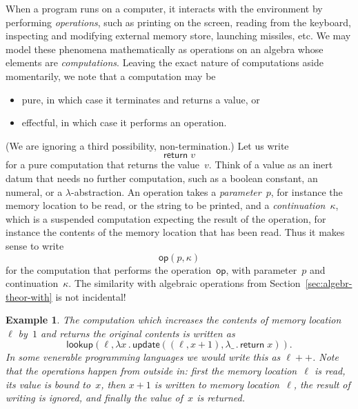 \documentclass{amsart}
\newcommand{\lam}[1]{\lambda #1 \,.\,}
\newcommand{\kode}[1]{\mathsf{#1}}
\newcommand{\opcall}[3]{\kode{#1}(#2, #3)}
\newcommand{\return}[1]{\kode{return}\;#1}
\newtheorem{example}{Example}[section]
\begin{document}
When a program runs on a computer, it interacts with the environment by
performing \emph{operations}, such as printing on the screen, reading from the
keyboard, inspecting and modifying external memory store, launching missiles,
etc. We may model these phenomena mathematically as operations on an algebra
whose elements are \emph{computations}. Leaving the exact nature of computations
aside momentarily, we note that a computation may be
%
\begin{itemize}
\item pure, in which case it terminates and returns a value, or
\item effectful, in which case it performs an operation.
\end{itemize}
%
(We are ignoring a third possibility, non-termination.) Let us write
%
\begin{equation*}
  \return{v}
\end{equation*}
%
for a pure computation that returns the value~$v$. Think of a value as an inert
datum that needs no further computation, such as a boolean constant, an numeral,
or a $\lambda$-abstraction. An operation takes a \emph{parameter}~$p$, for
instance the memory location to be read, or the string to be printed, and a
\emph{continuation}~$\kappa$, which is a suspended computation expecting the
result of the operation, for instance the contents of the memory location that
has been read. Thus it makes sense to write
%
\begin{equation*}
  \opcall{op}{p}{\kappa}
\end{equation*}
%
for the computation that performs the operation~$\kode{op}$, with parameter~$p$
and continuation~$\kappa$. The similarity with algebraic operations from
Section~\ref{sec:algebr-theor-with} is not incidental!

\begin{example}
  The computation which increases the contents of memory location~$\ell$ by~$1$
  and returns the original contents is written as
  \begin{equation*}
    \opcall{lookup}{\ell}{
    \lam{x} \opcall{update}{(\ell,x + 1)}{
    \lam{\_} \return{x}
    }
    }.
  \end{equation*}
  In some venerable programming languages we would write this as $\ell{+}{+}$.
  Note that the operations happen from outside in: first the memory
  location~$\ell$ is read, its value is bound to~$x$, then $x + 1$ is written to
  memory location~$\ell$, the result of writing is ignored, and finally the
  value of~$x$ is returned.
\end{example}
\end{document}
